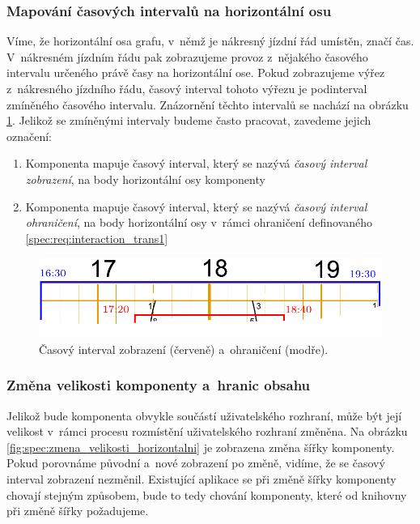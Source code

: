 \subsubsection*{Mapování časových intervalů na horizontální osu}
\label{kap2:time_intervals}
Víme, že horizontální osa grafu, v~němž je nákresný jízdní řád umístěn, značí čas. V~nákresném jízdním řádu pak zobrazujeme provoz z~nějakého časového intervalu určeného právě časy na horizontální ose. Pokud zobrazujeme výřez z~nákresného jízdního řádu, časový interval tohoto výřezu je podinterval zmíněného časového intervalu. Znázornění těchto intervalů se nachází na obrázku \ref{fig:spec:casove_intervaly}. Jelikož se zmíněnými intervaly budeme často pracovat, zavedeme jejich označení:

\begin{enumerate}[label=\color{reqcolor}\textbf{R{\arabic*}},resume]
	\item \label{spec:req:int1} Komponenta mapuje časový interval, který se nazývá \textit{časový interval zobrazení}, na body horizontální osy komponenty
	\item \label{spec:req:int2}	Komponenta mapuje časový interval, který se nazývá \textit{časový interval ohraničení}, na body horizontální osy v~rámci ohraničení definovaného \ref{spec:req:interaction_trans1}
\end{enumerate}

\begin{figure}[!htb]
	\centering
	\includegraphics[width=\textwidth]{../img/kap2_time_intervals}
	\caption{Časový interval zobrazení (červeně) a~ohraničení (modře).}
	\label{fig:spec:casove_intervaly}
\end{figure}

\subsubsection*{Změna velikosti komponenty a~hranic obsahu}
Jelikož bude komponenta obvykle součástí uživatelského rozhraní, může být její velikost v~rámci procesu rozmístění uživatelského rozhraní změněna. Na obrázku \ref{fig:spec:zmena_velikosti_horizontalni} je zobrazena změna šířky komponenty. Pokud porovnáme původní a~nové zobrazení po změně, vidíme, že se časový interval zobrazení nezměnil. Existující aplikace se při změně šířky komponenty chovají stejným způsobem, bude to tedy chování komponenty, které od knihovny při změně šířky požadujeme.


